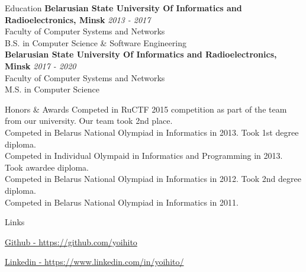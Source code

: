 \documentclass{resume}
\begin{document}
  \begin{rSection}{Education}
    {\bf Belarusian State University Of Informatics and Radioelectronics, Minsk} \hfill {\em 2013 - 2017} \\ 
    { Faculty of Computer Systems and Networks } \\
    { B.S. in Computer Science \& Software Engineering } \\
    {\bf Belarusian State University Of Informatics and Radioelectronics, Minsk} \hfill {\em 2017 - 2020} \\ 
    { Faculty of Computer Systems and Networks } \\
    { M.S. in Computer Science } \\
  \end{rSection}

  \begin{rSection}{Honors \& Awards}
  {Competed in RuCTF 2015 competition as part of the team from our university. Our team took 2nd place.} \\
  {Competed in Belarus National Olympiad in Informatics in 2013. Took 1st degree diploma.} \\
  {Competed in Individual Olympaid in Informatics and Programming in 2013. Took awardee diploma.} \\
  {Competed in Belarus National Olympiad in Informatics in 2012. Took 2nd degree diploma.} \\
  {Competed in Belarus National Olympiad in Informatics in 2011.}
  \end{rSection}

  \begin{rSection}{Links}
  \item \href{https://github.com/yoihito}{Github - https://github.com/yoihito}
  \item \href{https://www.linkedin.com/in/yoihito/}{Linkedin - https://www.linkedin.com/in/yoihito/}
  \end{rSection}    
\end{document}
